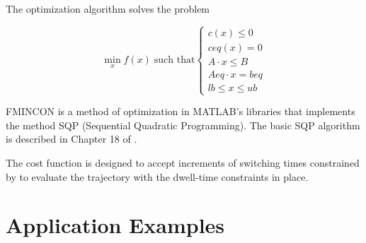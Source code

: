     The optimization algorithm solves the problem 
    
    \begin{equation}
        \min_x f(x) \;\text{such that} 
        \begin{cases}
            c(x) \le 0 \\ 
            ceq(x) = 0 \\
            A \cdot x \le B \\
            Aeq \cdot x = beq \\
            lb \le x \le ub
        \end{cases}
        \nonumber
    \end{equation}

    FMINCON is a method of optimization in MATLAB's libraries that implements the method 
    SQP (Sequential Quadratic Programming). 
    The basic SQP algorithm is described in Chapter 18 of .

    The cost function  is designed to accept increments of switching times constrained by 
     to evaluate the trajectory with the dwell-time constraints in place.

\section{Application Examples}


